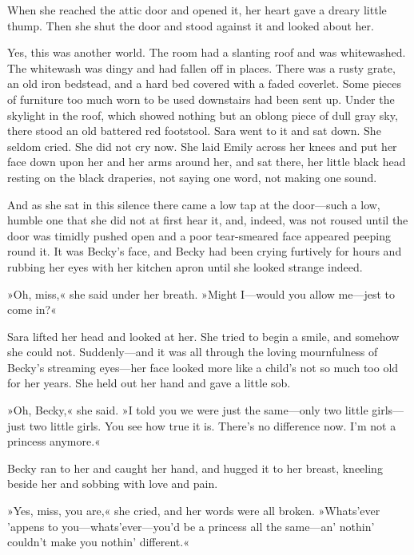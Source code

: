 When she reached the attic door and opened it, her heart gave a dreary little thump. Then she shut the door and stood against it and looked about her.

Yes, this was another world. The room had a slanting roof and was whitewashed. The whitewash was dingy and had fallen off in places. There was a rusty grate, an old iron bedstead, and a hard bed covered with a faded coverlet. Some pieces of furniture too much worn to be used downstairs had been sent up. Under the skylight in the roof, which showed nothing but an oblong piece of dull gray sky, there stood an old battered red footstool. Sara went to it and sat down. She seldom cried. She did not cry now. She laid Emily across her knees and put her face down upon her and her arms around her, and sat there, her little black head resting on the black draperies, not saying one word, not making one sound.

And as she sat in this silence there came a low tap at the door—such a low, humble one that she did not at first hear it, and, indeed, was not roused until the door was timidly pushed open and a poor tear-smeared face appeared peeping round it. It was Becky's face, and Becky had been crying furtively for hours and rubbing her eyes with her kitchen apron until she looked strange indeed.

»Oh, miss,« she said under her breath. »Might I—would you allow me—jest to come in?«

Sara lifted her head and looked at her. She tried to begin a smile, and somehow she could not. Suddenly—and it was all through the loving mournfulness of Becky's streaming eyes—her face looked more like a child's not so much too old for her years. She held out her hand and gave a little sob.

»Oh, Becky,« she said. »I told you we were just the same—only two little girls—just two little girls. You see how true it is. There's no difference now. I'm not a princess anymore.«

Becky ran to her and caught her hand, and hugged it to her breast, kneeling beside her and sobbing with love and pain.

»Yes, miss, you are,« she cried, and her words were all broken. »Whats'ever 'appens to you—whats'ever—you'd be a princess all the same—an' nothin' couldn't make you nothin' different.«